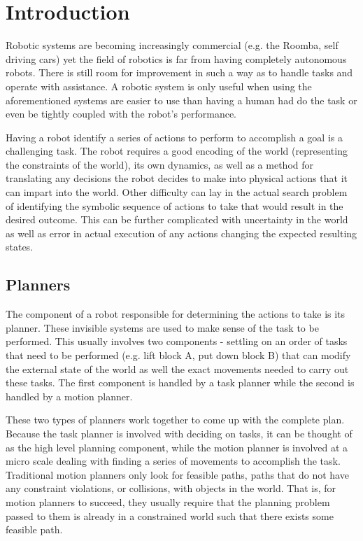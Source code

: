 \chapter{Introduction} \label{intro}
Robotic systems are becoming increasingly commercial (e.g. the Roomba, self driving cars) yet the field of robotics is far from having completely autonomous robots. There is still room for improvement in such a way as to handle tasks and operate with assistance. A robotic system is only useful when using the aforementioned systems are easier to use than having a human had do the task or even be tightly coupled with the robot's performance.

Having a robot identify a series of actions to perform to accomplish a goal is a challenging task. The robot requires a good encoding of the world (representing the constraints of the world), its own dynamics, as well as a method for translating any decisions the robot decides to make into physical actions that it can impart into the world. Other difficulty can lay in the actual search problem of identifying the symbolic sequence of actions to take that would result in the desired outcome. This can be further complicated with uncertainty in the world as well as error in actual execution of any actions changing the expected resulting states.

\section{Planners} \label{intro:planners}
The component of a robot responsible for determining the actions to take is its planner. These invisible systems are used to make sense of the task to be performed. This usually involves two components - settling on an order of tasks that need to be performed (e.g. lift block A, put down block B) that can modify the external state of the world as well the exact movements needed to carry out these tasks. The first component is handled by a task planner while the second is handled by a motion planner. 

These two types of planners work together to come up with the complete plan. Because the task planner is involved with deciding on tasks, it can be thought of as the high level planning component, while the motion planner is involved at a micro scale dealing with finding a series of movements to accomplish the task. Traditional motion planners only look for feasible paths, paths that do not have any constraint violations, or collisions, with objects in the world. That is, for motion planners to succeed, they usually require that the planning problem passed to them is already in a constrained world such that there exists some feasible path. 

